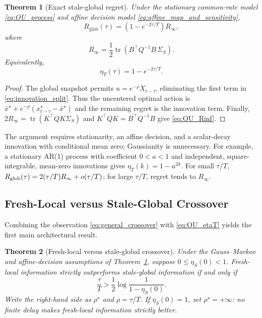 \documentclass[11pt]{article}
\newtheorem{theorem}{Theorem}
\begin{document}
\begin{theorem}[Exact stale-global regret]
\label{thm:OU_stale_regret}
Under the stationary common-rate model \eqref{eq:OU_process} and affine decision model \eqref{eq:affine_map_and_sensitivity},
\begin{equation}
    \boxed{
    R_{\mathrm{glob}}(\tau)
    =
    \left(
        1-e^{-2\tau/T}
    \right)R_\infty,
    }
    \label{eq:OU_exact_regret}
\end{equation}
where
\begin{equation}
    R_\infty
    =
    \frac{1}{2}
    \operatorname{tr}
    \left(
        B^\top Q^{-1}B\,
        \Sigma_S
    \right).
    \label{eq:OU_Rinf}
\end{equation}
Equivalently,
\begin{equation}
    \boxed{
    \eta_T(\tau)
    =
    1-e^{-2\tau/T}.
    }
    \label{eq:OU_etaT}
\end{equation}
\end{theorem}

\begin{proof}
The global snapshot permits $u=e^{-\rho}X_{t-\tau}$, eliminating the first
term in \eqref{eq:innovation_split}. Thus the uncentered optimal action is
$\bar x^\star+e^{-\rho}(x_{t-\tau}^\star-\bar x^\star)$ and the remaining
regret is the innovation term. Finally,
$2R_\infty=\operatorname{tr}(K^\top QK\Sigma_S)$ and
$K^\top QK=B^\top Q^{-1}B$ give \eqref{eq:OU_Rinf}.
\end{proof}

The argument requires stationarity, an affine decision, and a scalar-decay
innovation with conditional mean zero; Gaussianity is unnecessary. For example,
a stationary AR(1) process with coefficient $0<a<1$ and independent,
square-integrable, mean-zero innovations gives $\eta_T(k)=1-a^{2k}$.
For small $\tau/T$, $R_{\rm glob}(\tau)=2(\tau/T)R_\infty+o(\tau/T)$;
for large $\tau/T$, regret tends to $R_\infty$.

\subsection{Fresh-Local versus Stale-Global Crossover}
\label{subsec:OU_crossover}

Combining the observation \eqref{eq:general_crossover} with
\eqref{eq:OU_etaT} yields the first main architectural result.

\begin{theorem}[Fresh-local versus stale-global crossover]
\label{thm:local_global_crossover}
Under the Gauss--Markov and affine-decision assumptions of
Theorem~\ref{thm:OU_stale_regret}, suppose
$0\le\eta_S(0)<1$. Fresh-local information strictly
outperforms stale-global information if and only if
\begin{equation}
    \boxed{
    \frac{\tau}{T}
    >
    \frac{1}{2}
    \log
    \frac{1}{1-\eta_S(0)}.
    }
    \label{eq:OU_crossover}
\end{equation}
Write the right-hand side as $\rho^\star$ and $\rho=\tau/T$.
If $\eta_S(0)=1$, set $\rho^\star=+\infty$: no finite delay makes fresh-local
information strictly better.

\end{theorem}
\end{document}
